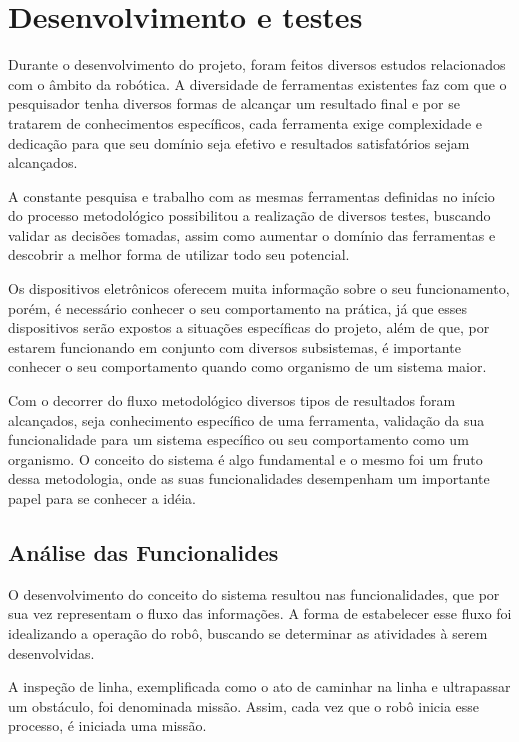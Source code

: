 \chapter{Desenvolvimento e testes}
\label{chap:desen_test}
Durante o desenvolvimento do projeto, foram feitos diversos estudos relacionados com o âmbito da robótica. A diversidade de ferramentas existentes faz com que o pesquisador tenha diversos formas de alcançar um resultado final e por se tratarem de conhecimentos específicos, cada ferramenta exige complexidade e dedicação para que seu domínio seja efetivo e resultados satisfatórios sejam alcançados.

A constante pesquisa e trabalho com as mesmas ferramentas definidas no início do processo metodológico possibilitou a realização de diversos testes, buscando validar as decisões tomadas, assim como aumentar o domínio das ferramentas e descobrir a melhor forma de utilizar todo seu potencial.

Os dispositivos eletrônicos oferecem muita informação sobre o seu funcionamento, porém, é necessário conhecer o seu comportamento na prática, já que esses dispositivos serão expostos a situações específicas do projeto, além de que, por estarem funcionando em conjunto com diversos subsistemas, é importante conhecer o seu comportamento quando como organismo de um sistema maior.

Com o decorrer do fluxo metodológico diversos tipos de resultados foram alcançados, seja conhecimento específico de uma ferramenta, validação da sua funcionalidade para um sistema específico ou seu comportamento como um organismo.  O conceito do sistema é algo fundamental e o mesmo foi um fruto dessa metodologia, onde as suas funcionalidades desempenham um importante papel para se conhecer a idéia.

\section{Análise das Funcionalides}
\label{sec:analise_func}
O desenvolvimento do conceito do sistema resultou nas funcionalidades, que por sua vez representam o fluxo das informações. A forma de estabelecer esse fluxo foi idealizando a operação do robô, buscando se determinar as atividades à serem desenvolvidas.

A inspeção de linha, exemplificada como o ato de caminhar na linha e ultrapassar um obstáculo, foi denominada missão. Assim, cada vez que o robô inicia esse processo, é iniciada uma missão.

